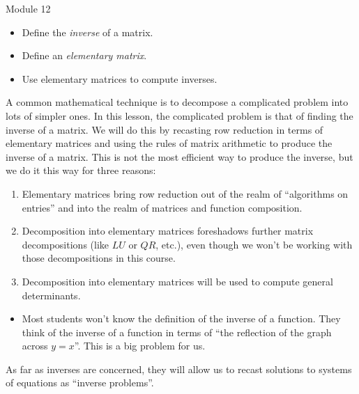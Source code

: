\begin{lesson}

	Module 12

	\begin{itemize}
		\item Define the \emph{inverse} of a matrix.
		\item Define an \emph{elementary matrix}.
		\item Use elementary matrices to compute inverses.
	\end{itemize}

	A common mathematical technique is to decompose a complicated problem into lots of simpler ones.
	In this lesson, the complicated problem is that of finding the inverse of a matrix. We will do this
	by recasting row reduction in terms of elementary matrices and using the rules of matrix arithmetic
	to produce the inverse of a matrix. This is not the most efficient way to produce the inverse, but we
	do it this way for three reasons:
	\begin{enumerate}
		\item Elementary matrices bring row reduction out of the realm of ``algorithms on entries'' and into
			the realm of matrices and function composition.
		\item Decomposition into elementary matrices foreshadows further matrix decompositions (like $LU$ or $QR$, etc.),
			even though we won't be working with those decompositions in this course.
		\item Decomposition into elementary matrices will be used to compute general determinants.
	\end{enumerate}


	\begin{annotation}
		\begin{notes}
			\begin{itemize}
				\item Most students won't know the definition of the inverse of a function.
					They think of the inverse of a function in terms of ``the reflection of the graph
					across $y=x$''. This is a big problem for us.
			\end{itemize}
		\end{notes}
	\end{annotation}
	As far as inverses are concerned, they will allow us to recast solutions to systems of equations as ``inverse problems''.


\end{lesson}

